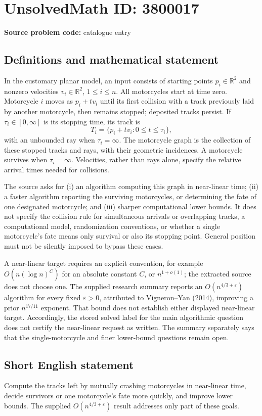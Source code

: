 \documentclass[11pt]{article}
\newcommand{\R}{\mathbb{R}}
\begin{document}
\section*{UnsolvedMath ID: 3800017}
\textbf{Source problem code:} catalogue entry
\subsection{Definitions and mathematical statement}
In the customary planar model, an input consists of starting points \(p_i\in\R^2\) and nonzero velocities \(v_i\in\R^2\), \(1\le i\le n\). All motorcycles start at time zero. Motorcycle \(i\) moves as \(p_i+tv_i\) until its first collision with a track previously laid by another motorcycle, then remains stopped; deposited tracks persist. If \(\tau_i\in[0,\infty]\) is its stopping time, its track is
\[
T_i=\{p_i+tv_i:0\le t\le\tau_i\},
\]
with an unbounded ray when \(\tau_i=\infty\). The motorcycle graph is the collection of these stopped tracks and rays, with their geometric incidences. A motorcycle survives when \(\tau_i=\infty\). Velocities, rather than rays alone, specify the relative arrival times needed for collisions.

The source asks for (i) an algorithm computing this graph in near-linear time; (ii) a faster algorithm reporting the surviving motorcycles, or determining the fate of one designated motorcycle; and (iii) sharper computational lower bounds. It does not specify the collision rule for simultaneous arrivals or overlapping tracks, a computational model, randomization conventions, or whether a single motorcycle's fate means only survival or also its stopping point. General position must not be silently imposed to bypass these cases.

A near-linear target requires an explicit convention, for example \(O(n(\log n)^C)\) for an absolute constant \(C\), or \(n^{1+o(1)}\); the extracted source does not choose one. The supplied research summary reports an \(O(n^{4/3+\varepsilon})\) algorithm for every fixed \(\varepsilon>0\), attributed to Vigneron--Yan (2014), improving a prior \(n^{17/11}\) exponent. That bound does not establish either displayed near-linear target. Accordingly, the stored solved label for the main algorithmic question does not certify the near-linear request as written. The summary separately says that the single-motorcycle and finer lower-bound questions remain open.
\subsection{Short English statement}
Compute the tracks left by mutually crashing motorcycles in near-linear time, decide survivors or one motorcycle's fate more quickly, and improve lower bounds. The supplied \(O(n^{4/3+\varepsilon})\) result addresses only part of these goals.
\end{document}
